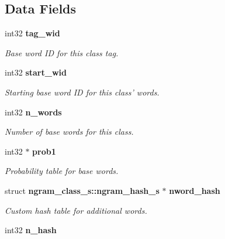 \subsection*{Data Fields}
\begin{CompactItemize}
\item 
int32 {\bf tag\_\-wid}\label{structngram__class__s_b5f3cc0142c9fd91b3c3d0e59906b556}

\begin{CompactList}\small\item\em Base word ID for this class tag. \item\end{CompactList}\item 
int32 {\bf start\_\-wid}\label{structngram__class__s_370c88602c7c1f7e3ff1a767c027f5cb}

\begin{CompactList}\small\item\em Starting base word ID for this class' words. \item\end{CompactList}\item 
int32 {\bf n\_\-words}\label{structngram__class__s_f13562cbc44647435f315b18df5688dc}

\begin{CompactList}\small\item\em Number of base words for this class. \item\end{CompactList}\item 
int32 $\ast$ {\bf prob1}\label{structngram__class__s_50077f48f135f1c666745a21574e4205}

\begin{CompactList}\small\item\em Probability table for base words. \item\end{CompactList}\item 
struct {\bf ngram\_\-class\_\-s::ngram\_\-hash\_\-s} $\ast$ {\bf nword\_\-hash}\label{structngram__class__s_ab28f6b41e4020455ff2484a6fa850bb}

\begin{CompactList}\small\item\em Custom hash table for additional words. \item\end{CompactList}\item 
int32 {\bf n\_\-hash}\label{structngram__class__s_7f450019eb6dc2e31b18eb3ab6009920}


\end{CompactItemize}
